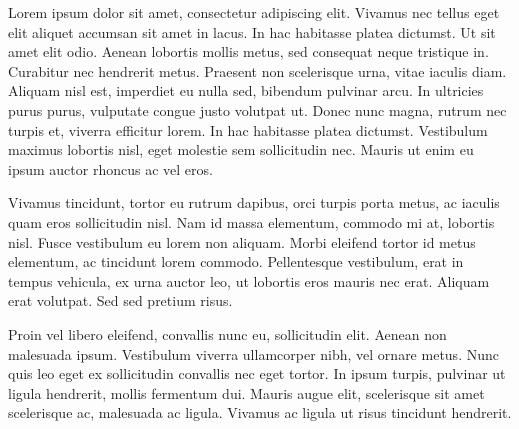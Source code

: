 \begin{acknowledgements}

Lorem ipsum dolor sit amet, consectetur adipiscing elit. Vivamus nec tellus eget elit aliquet accumsan sit amet in lacus. In hac habitasse platea dictumst. Ut sit amet elit odio. Aenean lobortis mollis metus, sed consequat neque tristique in. Curabitur nec hendrerit metus. Praesent non scelerisque urna, vitae iaculis diam. Aliquam nisl est, imperdiet eu nulla sed, bibendum pulvinar arcu. In ultricies purus purus, vulputate congue justo volutpat ut. Donec nunc magna, rutrum nec turpis et, viverra efficitur lorem. In hac habitasse platea dictumst. Vestibulum maximus lobortis nisl, eget molestie sem sollicitudin nec. Mauris ut enim eu ipsum auctor rhoncus ac vel eros.

Vivamus tincidunt, tortor eu rutrum dapibus, orci turpis porta metus, ac iaculis quam eros sollicitudin nisl. Nam id massa elementum, commodo mi at, lobortis nisl. Fusce vestibulum eu lorem non aliquam. Morbi eleifend tortor id metus elementum, ac tincidunt lorem commodo. Pellentesque vestibulum, erat in tempus vehicula, ex urna auctor leo, ut lobortis eros mauris nec erat. Aliquam erat volutpat. Sed sed pretium risus.

Proin vel libero eleifend, convallis nunc eu, sollicitudin elit. Aenean non malesuada ipsum. Vestibulum viverra ullamcorper nibh, vel ornare metus. Nunc quis leo eget ex sollicitudin convallis nec eget tortor. In ipsum turpis, pulvinar ut ligula hendrerit, mollis fermentum dui. Mauris augue elit, scelerisque sit amet scelerisque ac, malesuada ac ligula. Vivamus ac ligula ut risus tincidunt hendrerit.

\end{acknowledgements}